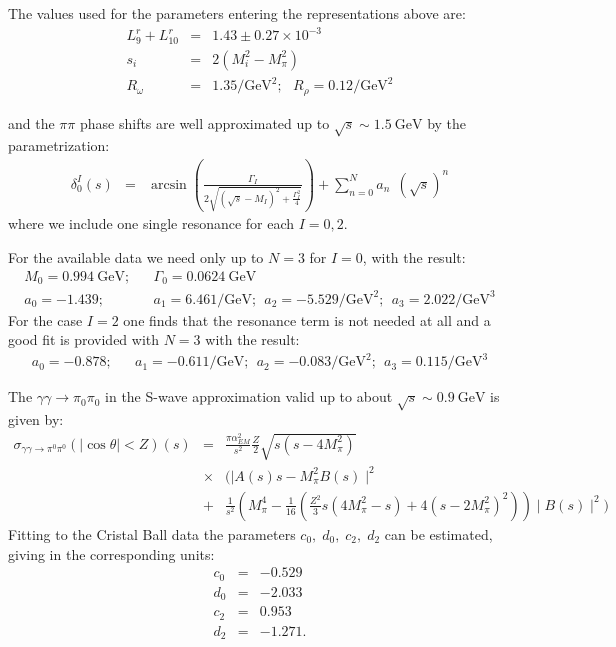 \documentclass[12pt]{article}
\newcommand{\bea}{\begin{eqnarray}}
\newcommand{\eea}{\end{eqnarray}}
\begin{document}
The values used for the parameters entering the representations above are:
\bea
L_9^r+L_{10}^r&=&1.43\pm 0.27\times 10^{-3}\nonumber\\
s_i&=&2 (M_i^2-M_\pi^2)\nonumber\\
R_\omega&=& 1.35/\mathrm{GeV}^2;~~~R_\rho=0.12/\mathrm{GeV}^2
\eea

and the $\pi\pi$ phase shifts are well approximated up to $\sqrt{s}\sim 1.5~\mathrm{GeV}$ by the parametrization:
\bea
\delta_0^I(s)&=& \arcsin\left(\frac{\Gamma_I}{2\sqrt{(\sqrt{s} - M_I)^2 +\frac{ \Gamma_I^2}{4}}}\right)+\sum_{n=0}^N a_n\;\, (\sqrt{s})^n
\eea
where we include one single resonance for each $I=0,2$.

For the available data we need only up to $N=3$ for $I=0$, with the result:
\bea
M_0=0.994~\mathrm{GeV};&&\Gamma_0=0.0624~\mathrm{GeV}\nonumber\\
a_0=-1.439;&&a_1=6.461 /\mathrm{GeV};~~a_2=-5.529 /\mathrm{GeV}^2;~~a_3=2.022 /\mathrm{GeV}^3
\eea
For the case $I=2$ one finds that   the resonance term is not needed at all and a good fit is provided with $N=3$ with the result:
\bea
a_0=-0.878;&&a_1=-0.611 /\mathrm{GeV};~~a_2=-0.083 /\mathrm{GeV}^2;~~a_3=0.115 /\mathrm{GeV}^3
\eea


The $\gamma\gamma\to\pi_0\pi_0$ in the S-wave approximation
valid up to about $\sqrt{s}\sim 0.9~\mathrm{GeV}$ is given by:
\bea
\sigma_{\gamma\gamma\to\pi^0\pi^0}(|\cos \theta|<Z)(s)&=&\frac{\pi \alpha_{EM}^2}{s^2}
\frac Z2  \sqrt{s (s -4 M_\pi^2)} \\
&\times&(\mid A(s) s-M_\pi^2  B(s)\mid^2\nonumber\\
&+&\frac {1}{s^2} \left(M_\pi^4- \frac{1}{16}(\frac{Z^2}{3} s(4 M_\pi^2-s)+4(s-2 M_\pi^2)^2)\right)\mid B(s)\mid ^2) \nonumber
\eea
 Fitting to the Cristal Ball data the parameters $c_0,\;d_0,\;c_2,\;d_2$ can be estimated,  giving in the corresponding units: 
\bea
c_0&=& -0.529 \nonumber\\
d_0&=&-2.033 \nonumber\\
c_2&=& 0.953\nonumber\\
d_2&=& -1.271.
\eea


 
\end{document}
